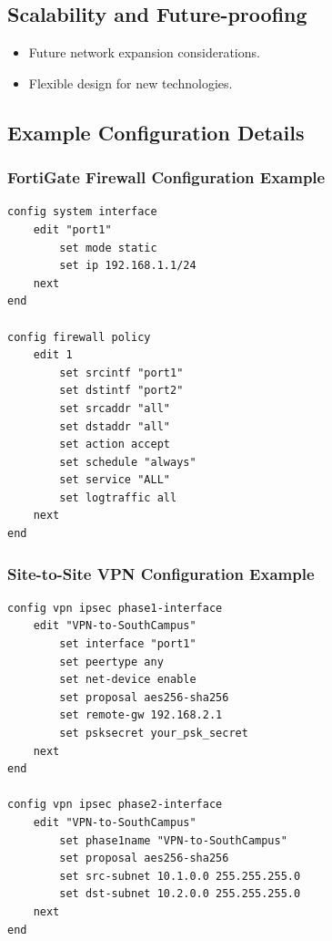 \documentclass[12pt]{report}
\begin{document}
\subsection{Scalability and Future-proofing}
\begin{itemize}
    \item Future network expansion considerations.
    \item Flexible design for new technologies.
\end{itemize}

\subsection{Example Configuration Details}

\subsubsection{FortiGate Firewall Configuration Example} 
\begin{verbatim}
config system interface
    edit "port1"
        set mode static
        set ip 192.168.1.1/24
    next
end

config firewall policy
    edit 1
        set srcintf "port1"
        set dstintf "port2"
        set srcaddr "all"
        set dstaddr "all"
        set action accept
        set schedule "always"
        set service "ALL"
        set logtraffic all
    next
end
\end{verbatim}

\subsubsection{Site-to-Site VPN Configuration Example}
\begin{verbatim}
config vpn ipsec phase1-interface
    edit "VPN-to-SouthCampus"
        set interface "port1"
        set peertype any
        set net-device enable
        set proposal aes256-sha256
        set remote-gw 192.168.2.1
        set psksecret your_psk_secret
    next
end

config vpn ipsec phase2-interface
    edit "VPN-to-SouthCampus"
        set phase1name "VPN-to-SouthCampus"
        set proposal aes256-sha256
        set src-subnet 10.1.0.0 255.255.255.0
        set dst-subnet 10.2.0.0 255.255.255.0
    next
end
\end{verbatim}


\newpage
\end{document}

